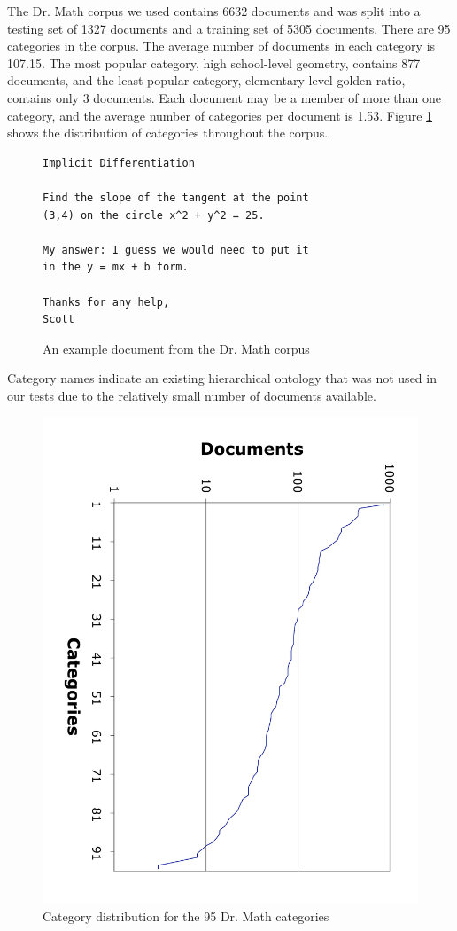 \documentclass[twocolumn]{article}
\begin{document}
The Dr. Math corpus we used contains 6632 documents and was split into a testing 
set of 1327 documents and a training set of 5305 documents.  There are 95 categories 
in the corpus. The average number of documents in each category is
107.15.  The most popular category, high school-level geometry,
contains 877 documents, and the least popular category,
elementary-level golden ratio, contains only 3 documents.  Each
document may be a member of more than one category, and the average
number of categories per document is 1.53.  Figure
\ref{cat-distribution} shows the distribution of categories throughout
the corpus.

\begin{figure}
\begin{verbatim}
Implicit Differentiation

Find the slope of the tangent at the point
(3,4) on the circle x^2 + y^2 = 25.

My answer: I guess we would need to put it
in the y = mx + b form. 

Thanks for any help,
Scott
\end{verbatim}
\caption{An example document from the Dr. Math corpus}
\end{figure}

Category names indicate an existing hierarchical ontology that was not used in our 
tests due to the relatively small number of documents available.

\begin{figure}
\includegraphics[angle=90,width=\linewidth]{cat-distribution}
\caption{Category distribution for the 95 Dr. Math categories}
\label{cat-distribution}
\end{figure}
\end{document}
